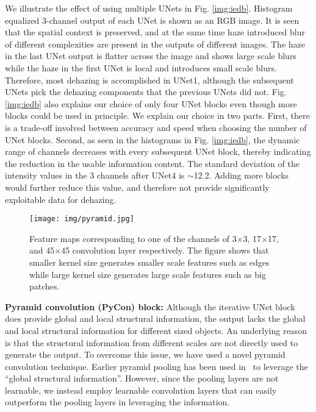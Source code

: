 \documentclass[runningheads]{llncs}
\begin{document}
We illustrate the effect of using multiple UNets in Fig. \ref{img:iedb}. Histogram equalized 3-channel output of each UNet is shown as an RGB image. It is seen that the spatial context is preserved, and at the same time haze introduced blur of different complexities are present in the outputs of different images. The haze in the last UNet output is flatter across the image and shows large scale blurs while the haze in the first UNet is local and introduces small scale blurs. Therefore, most dehazing is accomplished in UNet1, although the subsequent UNets pick the dehazing components that the previous UNets did not. Fig. \ref{img:iedb} also explains our choice of only four UNet blocks even though more blocks could be used in principle. We explain our choice in two parts. First, there is a trade-off involved between accuracy and speed when choosing the number of UNet blocks. Second, as seen in the histograms in Fig. \ref{img:iedb}, the dynamic range of channels decreases with every subsequent UNet block, thereby indicating the reduction in the usable information content. The standard deviation of the intensity values in the 3 channels after UNet4 is $\sim$12.2. Adding more blocks would further reduce this value, and therefore not provide significantly exploitable data for dehazing. 

\begin{figure*}[t]
\centering
\texttt{[image: img/pyramid.jpg]}
\caption{Feature maps corresponding to one of the channels of 3$\times$3, 17$\times$17, and 45$\times$45 convolution layer respectively. The figure shows that smaller kernel size generates smaller scale features such as edges while large kernel size generates large scale features such as big patches.}
\label{img:newfig}
\end{figure*}

 
{\textbf{Pyramid convolution (PyCon) block:}} 
Although the iterative UNet block does provide global and local structural information, the output lacks the global and local structural information for different sized objects. An underlying reason is that the structural information from different scales are not directly used to generate the output.  To overcome this issue, we have used a novel pyramid convolution technique. Earlier pyramid pooling has been used in~\cite{ronneberger2015u} to leverage the “global structural information”. However, since the pooling layers are not learnable, we instead employ learnable convolution layers that can easily outperform the pooling layers in leveraging the information. 
\end{document}
